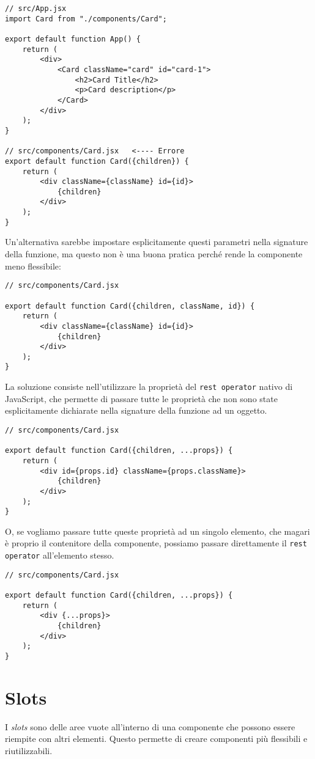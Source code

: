 \documentclass[12pt]{article}
\begin{document}
\begin{verbatim}
// src/App.jsx
import Card from "./components/Card";

export default function App() {
    return (
        <div>
            <Card className="card" id="card-1">
                <h2>Card Title</h2>
                <p>Card description</p>
            </Card>
        </div>
    );
}

// src/components/Card.jsx   <---- Errore
export default function Card({children}) {
    return (
        <div className={className} id={id}>
            {children}
        </div>
    );
}
\end{verbatim}
Un'alternativa sarebbe impostare esplicitamente questi parametri
nella signature della funzione, ma questo non è una buona pratica
perché rende la componente meno flessibile:

\begin{verbatim}
// src/components/Card.jsx

export default function Card({children, className, id}) {
    return (
        <div className={className} id={id}>
            {children}
        </div>
    );
}
\end{verbatim}

La soluzione consiste nell'utilizzare la proprietà del {\tt rest operator}
nativo di JavaScript, che permette di passare tutte le proprietà
che non sono state esplicitamente dichiarate nella signature della funzione
ad un oggetto.

\begin{verbatim}
// src/components/Card.jsx

export default function Card({children, ...props}) {
    return (
        <div id={props.id} className={props.className}>
            {children}
        </div>
    );
}
\end{verbatim}

O, se vogliamo passare tutte queste proprietà ad un singolo
elemento, che magari è proprio il contenitore della componente,
possiamo passare direttamente il {\tt rest operator} all'elemento
stesso.

\begin{verbatim}
// src/components/Card.jsx

export default function Card({children, ...props}) {
    return (
        <div {...props}>
            {children}
        </div>
    );
}
\end{verbatim}

\section{Slots}
I {\it slots} sono delle aree vuote all'interno di una componente
che possono essere riempite con altri elementi. 
Questo permette di creare componenti più flessibili e riutilizzabili.
\end{document}
